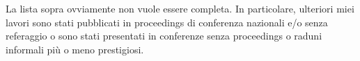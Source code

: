


La lista sopra ovviamente non vuole essere completa.
In particolare, ulteriori miei lavori sono stati pubblicati in proceedings
di conferenza nazionali e/o senza referaggio
o sono stati presentati in conferenze senza proceedings o raduni informali
pi\`u o meno prestigiosi.


\vspace{1.8mm}





\vspace{1.8mm}





\vspace{1.8mm}

{}





%
%






